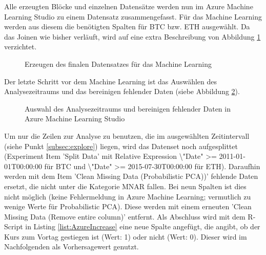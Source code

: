Alle erzeugten Blöcke und einzelnen Datensätze werden nun im Azure Machine Learning Studio zu einem Datensatz zusammengefasst. Für das Machine Learning werden aus diesem die benötigten Spalten für BTC bzw. ETH ausgewählt. Da das Joinen wie bisher verläuft, wird auf eine extra Beschreibung von Abbildung \ref{fig:azureFinalSet} verzichtet.
\begin{figure}[H]
\centering
{}
\caption{Erzeugen des finalen Datensatzes für das Machine Learning}
\label{fig:azureFinalSet}
\end{figure}
Der letzte Schritt vor dem Machine Learning ist das Auswählen des Analysezeitraums und das bereinigen fehlender Daten (siebe Abbildung \ref{fig:azureDateAndCleaning}).
\begin{figure}[H]
\centering
{}
\caption{Auswahl des Analysezeitraums und bereinigen fehlender Daten in Azure Machine Learning Studio}
\label{fig:azureDateAndCleaning}
\end{figure}
Um nur die Zeilen zur Analyse zu benutzen, die im ausgewählten Zeitintervall (siehe Punkt \ref{subsec:explore}) liegen, wird das Datenset noch aufgesplittet (Experiment Item 'Split Data' mit Relative Expression \textbackslash "Date" >= 2011-01-01T00:00:00 für BTC und \textbackslash "Date" >= 2015-07-30T00:00:00 für ETH). Daraufhin werden mit dem Item 'Clean Missing Data (Probabilistic PCA))' fehlende Daten ersetzt, die nicht unter die Kategorie MNAR fallen. Bei neun Spalten ist dies nicht möglich (keine Fehlermeldung in Azure Machine Learning; vermutlich zu wenige Werte für Probabilistic PCA). Diese werden mit einem erneuten 'Clean Missing Data (Remove entire column)' entfernt. Als Abschluss wird mit dem R-Script in Listing \ref{list:AzureIncrease} eine neue Spalte angefügt, die angibt, ob der Kurs zum Vortag gestiegen ist (Wert: 1) oder nicht (Wert: 0). Dieser wird im Nachfolgenden als Vorhersagewert genutzt.
